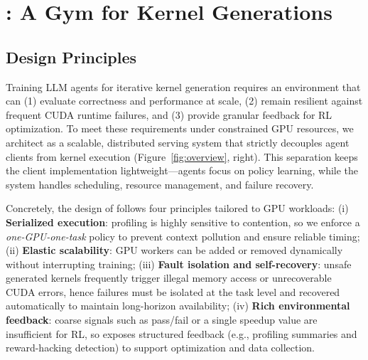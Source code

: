 \section{\env: A Gym for Kernel Generations}
\label{sec:kernelgym}
\subsection{Design Principles}
\label{sec:kernelgym:design}
Training LLM agents for iterative kernel generation requires an environment that can (1) evaluate correctness and performance at scale, (2) remain resilient against frequent CUDA runtime failures, and (3) provide granular feedback for RL optimization. To meet these requirements under constrained GPU resources, we architect \env{} as a scalable, distributed serving system that strictly decouples agent clients from kernel execution (Figure~\ref{fig:overview}, right). This separation keeps the client implementation lightweight---agents focus on policy learning, while the system handles scheduling, resource management, and failure recovery.

Concretely, the design of \env{} follows four principles tailored to GPU workloads: (i) \textbf{Serialized execution}: profiling is highly sensitive to contention, so we enforce a \emph{one-GPU-one-task} policy to prevent context pollution and ensure reliable timing; (ii) \textbf{Elastic scalability}: GPU workers can be added or removed dynamically without interrupting training; (iii) \textbf{Fault isolation and self-recovery}: unsafe generated kernels frequently trigger illegal memory access or unrecoverable CUDA errors, hence failures must be isolated at the task level and recovered automatically to maintain long-horizon availability; (iv) \textbf{Rich environmental feedback}: coarse signals such as pass/fail or a single speedup value are insufficient for RL, so \env{} exposes structured feedback (e.g., profiling summaries and reward-hacking detection) to support optimization and data collection.



